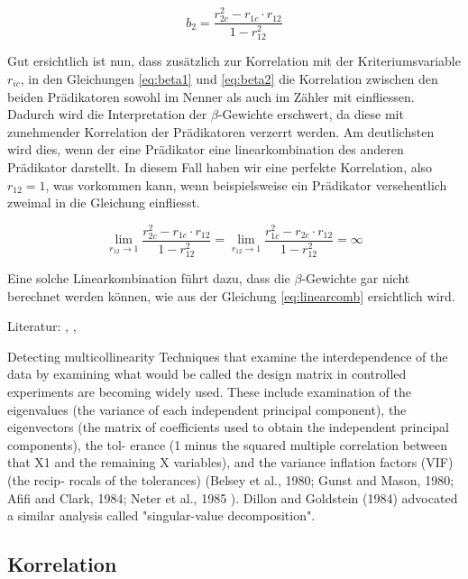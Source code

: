 \documentclass[english,12pt,doc]{apa}
\begin{document}
\begin{equation}
b_2 = \frac{r_{2c}^2 - r_{1c}\cdot r_{12}}{1-r_{12}^2}
\label{eq:beta2}
\end{equation}

Gut ersichtlich ist nun, dass zusätzlich zur Korrelation mit der Kriteriumsvariable $r_{ic}$, in den Gleichungen \ref{eq:beta1} und \ref{eq:beta2} die Korrelation zwischen den beiden Prädikatoren sowohl im Nenner als auch im Zähler mit einfliessen. Dadurch wird die Interpretation der $\beta$-Gewichte erschwert, da diese mit zunehmender Korrelation der Prädikatoren verzerrt werden. Am deutlichsten wird dies, wenn der eine Prädikator eine linearkombination des anderen Prädikator darstellt. In diesem Fall haben wir eine perfekte Korrelation, also $r_{12} = 1$, was vorkommen kann, wenn beispielsweise ein Prädikator versehentlich zweimal in die Gleichung einfliesst.

\begin{equation}
\lim_{r_{12} \to 1} \frac{r_{2c}^2 - r_{1c}\cdot r_{12}}{1-r_{12}^2} =  \lim_{r_{12} \to 1} \frac{r_{1c}^2 - r_{2c}\cdot r_{12}}{1-r_{12}^2} = \infty
\label{eq:linearcomb}
\end{equation}
 
Eine solche Linearkombination führt dazu, dass die $\beta$-Gewichte gar nicht berechnet werden können, wie aus der Gleichung \ref{eq:linearcomb} ersichtlich wird.

Literatur: \cite[p. 452ff]{bortz2011}, \cite{jacob2003applied}, \cite[p. 56ff]{harrell2001regression}

Detecting multicollinearity
Techniques that examine the interdependence of the data by examining what
would be called the design matrix in controlled experiments are becoming
widely used. These include examination of the eigenvalues (the variance of
each independent principal component), the eigenvectors (the matrix of
coefficients used to obtain the independent principal components), the tol-
erance (1 minus the squared multiple correlation between that X1 and the
remaining X variables), and the variance inflation factors (VIF) (the recip-
rocals of the tolerances) (Belsey et al., 1980; Gunst and Mason, 1980; Afifi
and Clark, 1984; Neter et al., 1985 ). Dillon and Goldstein (1984) advocated
a similar analysis called "singular-value decomposition". \cite[p. 3]{lafi1992explanation}
\subsection{Korrelation}
\blindtext
\end{document}
